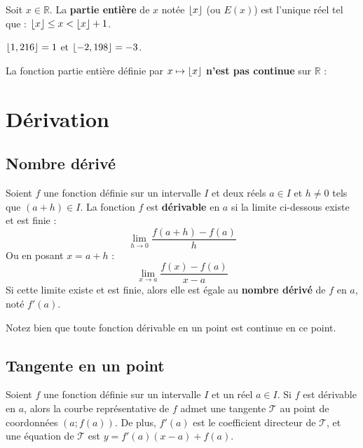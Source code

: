 	\begin{formula}[Définition]
		Soit $x \in \mathbb{R}$. La \textbf{partie entière} de $x$ notée $\lfloor x \rfloor$ (ou $E(x)$) est l'unique réel tel que : $\lfloor x \rfloor \leq x < \lfloor x \rfloor + 1$.
	\end{formula}

	\begin{tip}[Exemple]
		$\lfloor 1,216 \rfloor = 1$ et $\lfloor -2,198 \rfloor = -3$.
	\end{tip}

	La fonction partie entière définie par $x \mapsto \lfloor x \rfloor$ \textbf{n'est pas continue} sur $\mathbb{R}$ :


	\section{Dérivation}

	\subsection{Nombre dérivé}

	\begin{formula}[Définition]
		Soient $f$ une fonction définie sur un intervalle $I$ et deux réels $a \in I$ et $h \neq 0$ tels que $(a + h) \in I$. La fonction $f$ est \textbf{dérivable} en $a$ si la limite ci-dessous existe et est finie :
		\[ \lim\limits_{h \rightarrow 0} \frac{f(a + h) - f(a)}{h} \]
		Ou en posant $x = a + h$ :
		\[ \lim\limits_{x \rightarrow a} \frac{f(x) - f(a)}{x-a} \]
		Si cette limite existe et est finie, alors elle est égale au \textbf{nombre dérivé} de $f$ en $a$, noté $f'(a)$.
	\end{formula}

	\begin{tip}[Remarque]
		Notez bien que toute fonction dérivable en un point est continue en ce point.
	\end{tip}

	\subsection{Tangente en un point}

	\begin{formula}
		Soient $f$ une fonction définie sur un intervalle $I$ et un réel $a \in I$. Si $f$ est dérivable en $a$, alors la courbe représentative de $f$ admet une tangente $\mathcal{T}$ au point de coordonnées $(a; f(a))$.
		\newpar
		De plus, $f'(a)$ est le coefficient directeur de $\mathcal{T}$, et une équation de $\mathcal{T}$ est $y = f'(a)(x-a)+f(a)$.
	\end{formula}


